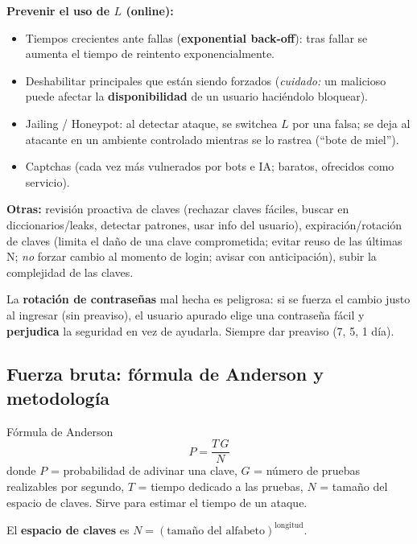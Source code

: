 \documentclass[../main.tex]{subfiles}
\begin{document}
\textbf{Prevenir el uso de $L$ (online):}
\begin{itemize}[itemsep=1pt]
  \item Tiempos crecientes ante fallas (\textbf{exponential back-off}): tras fallar se aumenta el tiempo de reintento exponencialmente.
  \item Deshabilitar principales que están siendo forzados (\emph{cuidado:} un malicioso puede afectar la \textbf{disponibilidad} de un usuario haciéndolo bloquear).
  \item Jailing / Honeypot: al detectar ataque, se switchea $L$ por una falsa; se deja al atacante en un ambiente controlado mientras se lo rastrea (``bote de miel'').
  \item Captchas (cada vez más vulnerados por bots e IA; baratos, ofrecidos como servicio).
\end{itemize}

\textbf{Otras:} revisión proactiva de claves (rechazar claves fáciles, buscar en diccionarios/leaks, detectar patrones, usar info del usuario), expiración/rotación de claves (limita el daño de una clave comprometida; evitar reuso de las últimas N; \emph{no} forzar cambio al momento de login; avisar con anticipación), subir la complejidad de las claves.

\begin{ojo}
La \textbf{rotación de contraseñas} mal hecha es peligrosa: si se fuerza el cambio justo al ingresar (sin preaviso), el usuario apurado elige una contraseña fácil y \textbf{perjudica} la seguridad en vez de ayudarla. Siempre dar preaviso (7, 5, 1 día).
\end{ojo}

\subsection{Fuerza bruta: fórmula de Anderson y metodología}

\begin{definicion}{Fórmula de Anderson}
$$P = \frac{T\,G}{N}$$
donde $P$ = probabilidad de adivinar una clave, $G$ = número de pruebas realizables por segundo, $T$ = tiempo dedicado a las pruebas, $N$ = tamaño del espacio de claves. Sirve para estimar el tiempo de un ataque.
\end{definicion}

El \textbf{espacio de claves} es $N = (\text{tamaño del alfabeto})^{\text{longitud}}$.
\end{document}

